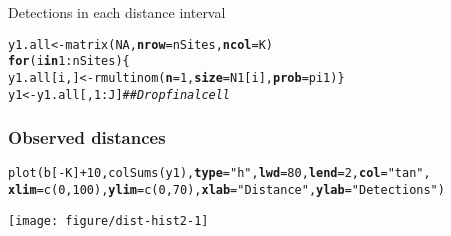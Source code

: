 \documentclass[color=usenames,dvipsnames]{beamer}\usepackage[]{graphicx}\usepackage[]{color}
\makeatletter
\newcommand{\hlnum}[1]{\textcolor[rgb]{0.69,0.494,0}{#1}}%
\newcommand{\hlstr}[1]{\textcolor[rgb]{0.749,0.012,0.012}{#1}}%
\newcommand{\hlcom}[1]{\textcolor[rgb]{0.514,0.506,0.514}{\textit{#1}}}%
\newcommand{\hlopt}[1]{\textcolor[rgb]{0,0,0}{#1}}%
\newcommand{\hlstd}[1]{\textcolor[rgb]{0,0,0}{#1}}%
\newcommand{\hlkwa}[1]{\textcolor[rgb]{0,0,0}{\textbf{#1}}}%
\newcommand{\hlkwb}[1]{\textcolor[rgb]{0,0.341,0.682}{#1}}%
\newcommand{\hlkwc}[1]{\textcolor[rgb]{0,0,0}{\textbf{#1}}}%
\newcommand{\hlkwd}[1]{\textcolor[rgb]{0.004,0.004,0.506}{#1}}%
\newenvironment{kframe}{%
 \def\at@end@of@kframe{}%
 \ifinner\ifhmode%
  \def\at@end@of@kframe{\end{minipage}}%
  \begin{minipage}{\columnwidth}%
 \fi\fi%
 \def\FrameCommand##1{\hskip\@totalleftmargin \hskip-\fboxsep
 \colorbox{shadecolor}{##1}\hskip-\fboxsep
     \hskip-\linewidth \hskip-\@totalleftmargin \hskip\columnwidth}%
 \MakeFramed {\advance\hsize-\width
   \@totalleftmargin\z@ \linewidth\hsize
   \@setminipage}}%
 {\par\unskip\endMakeFramed%
 \at@end@of@kframe}
\newenvironment{knitrout}{}{} %
\makeatother
\begin{document}
\begin{frame}[fragile]
\begin{knitrout}
\begin{kframe}
\end{kframe}
\end{knitrout}
  \pause
  \vfill
  Detections in each distance interval
  \vspace{-6pt}
\begin{knitrout}\scriptsize
{}\color{fgcolor}\begin{kframe}
\begin{alltt}
\hlstd{y1.all} \hlkwb{<-} \hlkwd{matrix}\hlstd{(}\hlnum{NA}\hlstd{,} \hlkwc{nrow}\hlstd{=nSites,} \hlkwc{ncol}\hlstd{=K)}
\hlkwa{for}\hlstd{(i} \hlkwa{in} \hlnum{1}\hlopt{:}\hlstd{nSites) \{}
    \hlstd{y1.all[i,]} \hlkwb{<-} \hlkwd{rmultinom}\hlstd{(}\hlkwc{n}\hlstd{=}\hlnum{1}\hlstd{,} \hlkwc{size}\hlstd{=N1[i],} \hlkwc{prob}\hlstd{=pi1)    \}}
\hlstd{y1} \hlkwb{<-} \hlstd{y1.all[,}\hlnum{1}\hlopt{:}\hlstd{J]}  \hlcom{## Drop final cell}
\end{alltt}
\end{kframe}
\end{knitrout}
\end{frame}



\begin{frame}[fragile]
  \frametitle{Observed distances}
  \centering
\begin{knitrout}\scriptsize
{}\color{fgcolor}\begin{kframe}
\begin{alltt}
\hlkwd{plot}\hlstd{(b[}\hlopt{-}\hlstd{K]}\hlopt{+}\hlnum{10}\hlstd{,} \hlkwd{colSums}\hlstd{(y1),} \hlkwc{type}\hlstd{=}\hlstr{"h"}\hlstd{,} \hlkwc{lwd}\hlstd{=}\hlnum{80}\hlstd{,} \hlkwc{lend}\hlstd{=}\hlnum{2}\hlstd{,} \hlkwc{col}\hlstd{=}\hlstr{"tan"}\hlstd{,}
     \hlkwc{xlim}\hlstd{=}\hlkwd{c}\hlstd{(}\hlnum{0}\hlstd{,}\hlnum{100}\hlstd{),} \hlkwc{ylim}\hlstd{=}\hlkwd{c}\hlstd{(}\hlnum{0}\hlstd{,} \hlnum{70}\hlstd{),} \hlkwc{xlab}\hlstd{=}\hlstr{"Distance"}\hlstd{,} \hlkwc{ylab}\hlstd{=}\hlstr{"Detections"}\hlstd{)}
\end{alltt}
\end{kframe}
\texttt{[image: figure/dist-hist2-1]} 

\end{knitrout}
\end{frame}
\end{document}
